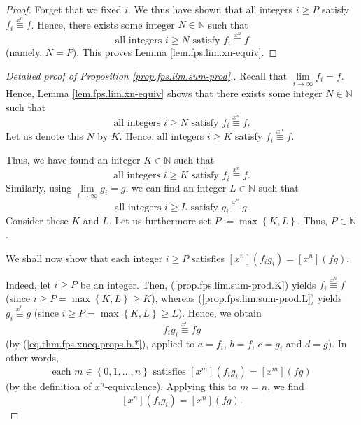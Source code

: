 \begin{fineprint}
\begin{proof}
Forget that we fixed $i$. We thus have shown that all integers $i\geq P$
satisfy $f_{i}\overset{x^{n}}{\equiv}f$. Hence, there exists some integer
$N\in\mathbb{N}$ such that
\[
\text{all integers }i\geq N\text{ satisfy }f_{i}\overset{x^{n}}{\equiv}f
\]
(namely, $N=P$). This proves Lemma \ref{lem.fps.lim.xn-equiv}.
\end{proof}

\begin{proof}
[Detailed proof of Proposition \ref{prop.fps.lim.sum-prod}.]Recall that
$\lim\limits_{i\rightarrow\infty}f_{i}=f$. Hence, Lemma
\ref{lem.fps.lim.xn-equiv} shows that there exists some integer $N\in
\mathbb{N}$ such that
\[
\text{all integers }i\geq N\text{ satisfy }f_{i}\overset{x^{n}}{\equiv}f.
\]
Let us denote this $N$ by $K$. Hence, all integers $i\geq K$ satisfy
$f_{i}\overset{x^{n}}{\equiv}f$.

Thus, we have found an integer $K\in\mathbb{N}$ such that%
\begin{equation}
\text{all integers }i\geq K\text{ satisfy }f_{i}\overset{x^{n}}{\equiv}f.
\label{prop.fps.lim.sum-prod.K}%
\end{equation}
Similarly, using $\lim\limits_{i\rightarrow\infty}g_{i}=g$, we can find an
integer $L\in\mathbb{N}$ such that
\begin{equation}
\text{all integers }i\geq L\text{ satisfy }g_{i}\overset{x^{n}}{\equiv}g.
\label{prop.fps.lim.sum-prod.L}%
\end{equation}
Consider these $K$ and $L$. Let us furthermore set $P:=\max\left\{
K,L\right\}  $. Thus, $P\in\mathbb{N}$.

We shall now show that each integer $i\geq P$ satisfies $\left[  x^{n}\right]
\left(  f_{i}g_{i}\right)  =\left[  x^{n}\right]  \left(  fg\right)  $.

Indeed, let $i\geq P$ be an integer. Then, (\ref{prop.fps.lim.sum-prod.K})
yields $f_{i}\overset{x^{n}}{\equiv}f$ (since $i\geq P=\max\left\{
K,L\right\}  \geq K$), whereas (\ref{prop.fps.lim.sum-prod.L}) yields
$g_{i}\overset{x^{n}}{\equiv}g$ (since $i\geq P=\max\left\{  K,L\right\}  \geq
L$). Hence, we obtain%
\[
f_{i}g_{i}\overset{x^{n}}{\equiv}fg
\]
(by (\ref{eq.thm.fps.xneq.props.b.*}), applied to $a=f_{i}$, $b=f$, $c=g_{i}$
and $d=g$). In other words,
\[
\text{each }m\in\left\{  0,1,\ldots,n\right\}  \text{ satisfies }\left[
x^{m}\right]  \left(  f_{i}g_{i}\right)  =\left[  x^{m}\right]  \left(
fg\right)
\]
(by the definition of $x^{n}$-equivalence). Applying this to $m=n$, we find%
\[
\left[  x^{n}\right]  \left(  f_{i}g_{i}\right)  =\left[  x^{n}\right]
\left(  fg\right)  .
\]



\end{proof}
\end{fineprint}
